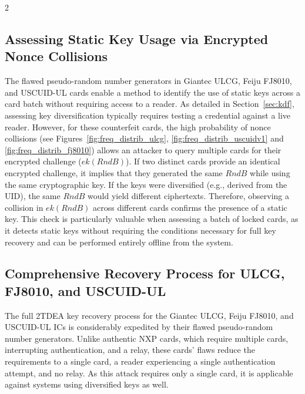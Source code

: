 \documentclass[10pt,letterpaper]{article}
\begin{document}
\begin{multicols}{2}
\vspace{0.5em}
\noindent
\begin{minipage}{\linewidth}
    \centering
    \resizebox{1.0\linewidth}{!}{}
    \captionsetup{hypcap=false}
    \label{fig:freq_distrib_fj8010}
\end{minipage}
\vspace{0.5em}

\subsection{Assessing Static Key Usage via Encrypted Nonce Collisions}
\label{sec:counterfeit_static_check}
The flawed pseudo-random number generators in Giantec ULCG, Feiju FJ8010, and USCUID-UL cards enable a method to identify the use of static keys across a card batch without requiring access to a reader.
As detailed in Section~\ref{sec:kdf}, assessing key diversification typically requires testing a credential against a live reader.
However, for these counterfeit cards, the high probability of nonce collisions (see Figures~\ref{fig:freq_distrib_ulcg}, \ref{fig:freq_distrib_uscuidv1} and \ref{fig:freq_distrib_fj8010}) allows an attacker to query multiple cards for their encrypted challenge ($ek(RndB)$).
If two distinct cards provide an identical encrypted challenge, it implies that they generated the same $RndB$ while using the same cryptographic key.
If the keys were diversified (e.g., derived from the UID), the same $RndB$ would yield different ciphertexts.
Therefore, observing a collision in $ek(RndB)$ across different cards confirms the presence of a static key.
This check is particularly valuable when assessing a batch of locked cards, as it detects static keys without requiring the conditions necessary for full key recovery and can be performed entirely offline from the system.

\subsection{Comprehensive Recovery Process for ULCG, FJ8010, and USCUID-UL}
\label{sec:counterfeit_recovery}
The full 2TDEA key recovery process for the Giantec ULCG, Feiju FJ8010, and USCUID-UL ICs is considerably expedited by their flawed pseudo-random number generators. Unlike authentic NXP cards, which require multiple cards, interrupting authentication, and a relay, these cards' flaws reduce the requirements to a single card, a reader experiencing a single authentication attempt, and no relay. As this attack requires only a single card, it is applicable against systems using diversified keys as well.


\end{multicols}
\end{document}
